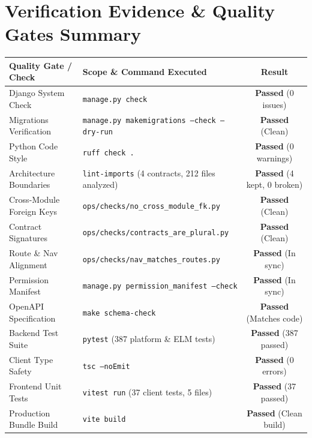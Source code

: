 \documentclass[11pt,a4paper]{article}
\begin{document}
\section{Verification Evidence \& Quality Gates Summary}
\begin{table}[h!]
\centering
\small
\begin{tabularx}{\textwidth}{l p{7.5cm} c}
\toprule
\textbf{Quality Gate / Check} & \textbf{Scope \& Command Executed} & \textbf{Result} \\
\midrule
Django System Check & \texttt{manage.py check} & \textbf{Passed} (0 issues) \\
Migrations Verification & \texttt{manage.py makemigrations --check --dry-run} & \textbf{Passed} (Clean) \\
Python Code Style & \texttt{ruff check .} & \textbf{Passed} (0 warnings) \\
Architecture Boundaries & \texttt{lint-imports} (4 contracts, 212 files analyzed) & \textbf{Passed} (4 kept, 0 broken) \\
Cross-Module Foreign Keys & \texttt{ops/checks/no\_cross\_module\_fk.py} & \textbf{Passed} (Clean) \\
Contract Signatures & \texttt{ops/checks/contracts\_are\_plural.py} & \textbf{Passed} (Clean) \\
Route \& Nav Alignment & \texttt{ops/checks/nav\_matches\_routes.py} & \textbf{Passed} (In sync) \\
Permission Manifest & \texttt{manage.py permission\_manifest --check} & \textbf{Passed} (In sync) \\
OpenAPI Specification & \texttt{make schema-check} & \textbf{Passed} (Matches code) \\
Backend Test Suite & \texttt{pytest} (387 platform \& ELM tests) & \textbf{Passed} (387 passed) \\
Client Type Safety & \texttt{tsc --noEmit} & \textbf{Passed} (0 errors) \\
Frontend Unit Tests & \texttt{vitest run} (37 client tests, 5 files) & \textbf{Passed} (37 passed) \\
Production Bundle Build & \texttt{vite build} & \textbf{Passed} (Clean build) \\
\bottomrule
\end{tabularx}
\end{table}
\end{document}
